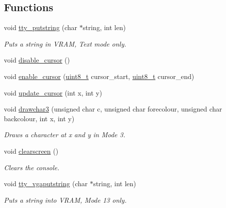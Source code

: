 \subsection*{Functions}
\begin{DoxyCompactItemize}
\item 
void \hyperlink{a00140_a5b5bf610a57f3c59b2851fa2652081ec_a5b5bf610a57f3c59b2851fa2652081ec}{tty\+\_\+putstring} (char $\ast$string, int len)
\begin{DoxyCompactList}\small\item\em Puts a string in V\+R\+AM, Text mode only. \end{DoxyCompactList}\item 
void \hyperlink{a00140_a3d09038c7b6436e60b228f2f3f451f6a_a3d09038c7b6436e60b228f2f3f451f6a}{disable\+\_\+cursor} ()
\item 
void \hyperlink{a00140_afe197dc4dbfa6036ef04abd2aeeeca2d_afe197dc4dbfa6036ef04abd2aeeeca2d}{enable\+\_\+cursor} (\hyperlink{a00116_aba7bc1797add20fe3efdf37ced1182c5_aba7bc1797add20fe3efdf37ced1182c5}{uint8\+\_\+t} cursor\+\_\+start, \hyperlink{a00116_aba7bc1797add20fe3efdf37ced1182c5_aba7bc1797add20fe3efdf37ced1182c5}{uint8\+\_\+t} cursor\+\_\+end)
\item 
void \hyperlink{a00140_a492f5021d7340613e732ef37bbaa04e4_a492f5021d7340613e732ef37bbaa04e4}{update\+\_\+cursor} (int x, int y)
\item 
void \hyperlink{a00140_acb9a978008cfa67b0038e85eb56d2d41_acb9a978008cfa67b0038e85eb56d2d41}{drawchar3} (unsigned char c, unsigned char forecolour, unsigned char backcolour, int x, int y)
\begin{DoxyCompactList}\small\item\em Draws a character at x and y in Mode 3. \end{DoxyCompactList}\item 
void \hyperlink{a00140_aff4bc17c602603d120756f52e18ebb96_aff4bc17c602603d120756f52e18ebb96}{clearscreen} ()
\begin{DoxyCompactList}\small\item\em Clears the console. \end{DoxyCompactList}\item 
void \hyperlink{a00140_a05ca3f5e64f38fec173b635ca8465415_a05ca3f5e64f38fec173b635ca8465415}{tty\+\_\+vgaputstring} (char $\ast$string, int len)
\begin{DoxyCompactList}\small\item\em Puts a string into V\+R\+AM, Mode 13 only. \end{DoxyCompactList}\item 

\end{DoxyCompactItemize}
